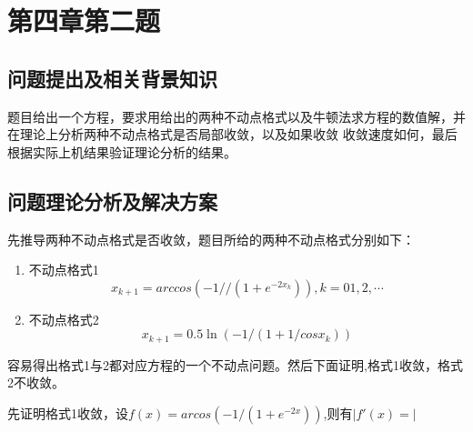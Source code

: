 \documentclass{ctexart}
\begin{document}
\section{第四章第二题}
\subsection{问题提出及相关背景知识}
题目给出一个方程，要求用给出的两种不动点格式以及牛顿法求方程的数值解，并在理论上分析两种不动点格式是否局部收敛，以及如果收敛
收敛速度如何，最后根据实际上机结果验证理论分析的结果。
\subsection{问题理论分析及解决方案}
先推导两种不动点格式是否收敛，题目所给的两种不动点格式分别如下：
\begin{enumerate}
	\item 不动点格式1
	\[x_{k+1}=arccos(-1//(1+e^{-2x_k})),k=01,2,\cdots \]
	\item 不动点格式2
	\[x_{k+1}=0.5\ln(-1/(1+1/cosx_k))\]
\end{enumerate}
容易得出格式1与2都对应方程的一个不动点问题。然后下面证明,格式1收敛，格式2不收敛。

先证明格式1收敛，设$f(x)=arcos(-1/(1+e^{-2x}))$,则有$|f'(x)=|$
\end{document}
